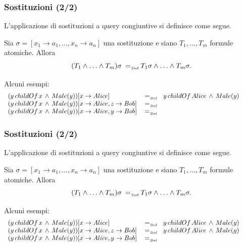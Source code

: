 \documentclass[8pt]{beamer}
\begin{document}
\begin{frame}
\frametitle{Sostituzioni (2/2)}

L'applicazione di sostituzioni a query congiuntive si definisce come segue.
\vspace{\baselineskip}

Sia $\sigma=[x_1 \rightarrow a_1, \ldots, x_n \rightarrow a_n]$ una sostituzione
e siano $T_1, \ldots, T_m$ formule atomiche. Allora
\[
 (T_1 \wedge \ldots \wedge T_m)\sigma \defAs T_1\sigma \wedge \ldots \wedge T_m\sigma . 
\]
\vspace{\baselineskip}

Alcuni esempi:
\[
 \begin{array}{lcl}
 (y\,childOf\,x\,\wedge\,Male(y))[x \rightarrow Alice] & \defAs & y\,childOf\,Alice\,\wedge\,Male(y)  \\
 (y\,childOf\,x\,\wedge\,Male(y))[x \rightarrow Alice, z \rightarrow Bob] & \defAs & \phantom{y\,childOf\,Alice\,\wedge\,Male(y)}  \\
 (y\,childOf\,x\,\wedge\,Male(y))[x \rightarrow Alice, y \rightarrow Bob] & \defAs & \phantom{Bob\,childOf\,Alice\,\wedge\,Male(Bob)}  \\
 \end{array}
\]
\end{frame}

\begin{frame}
\frametitle{Sostituzioni (2/2)}

L'applicazione di sostituzioni a query congiuntive si definisce come segue.
\vspace{\baselineskip}

Sia $\sigma=[x_1 \rightarrow a_1, \ldots, x_n \rightarrow a_n]$ una sostituzione
e siano $T_1, \ldots, T_m$ formule atomiche. Allora
\[
 (T_1 \wedge \ldots \wedge T_m)\sigma \defAs T_1\sigma \wedge \ldots \wedge T_m\sigma . 
\]
\vspace{\baselineskip}

Alcuni esempi:
\[
 \begin{array}{lcl}
 (y\,childOf\,x\,\wedge\,Male(y))[x \rightarrow Alice] & \defAs & y\,childOf\,Alice\,\wedge\,Male(y)  \\
 (y\,childOf\,x\,\wedge\,Male(y))[x \rightarrow Alice, z \rightarrow Bob] & \defAs & y\,childOf\,Alice\,\wedge\,Male(y)  \\
 (y\,childOf\,x\,\wedge\,Male(y))[x \rightarrow Alice, y \rightarrow Bob] & \defAs & \phantom{Bob\,childOf\,Alice\,\wedge\,Male(Bob)}  \\
 \end{array}
\]
\end{frame}
\end{document}
